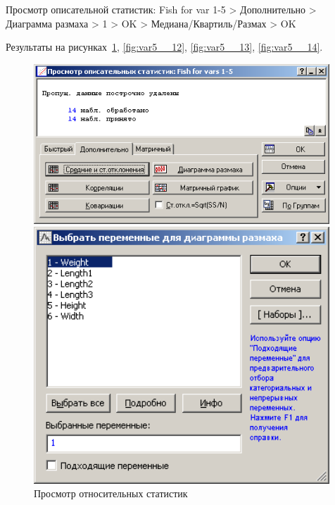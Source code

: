 Просмотр описательной статистик: Fish for var 1-5
> Дополнительно > Диаграмма размаха > 1 > OK > Медиана/Квартиль/Размах > OK

Результаты на рисунках~\ref{fig:var5__11}, \ref{fig:var5__12}, \ref{fig:var5__13}, \ref{fig:var5__14}.

\begin{figure}[!h]
  \centering
  \begin{minipage}{0.32\textwidth}
    \centering

    \includegraphics[width=0.99\textwidth]
    {inc/var5__11.PNG}

    \caption{Просмотр относительных статистик}
    \label{fig:var5__11}
  \end{minipage}
  \begin{minipage}{0.32\textwidth}
    \centering

    \includegraphics[width=0.99\textwidth]
    {inc/var5__12.PNG}


\end{minipage}
\end{figure}
